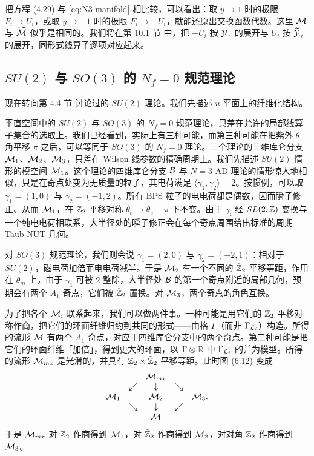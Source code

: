 把方程 (4.29)%
与 \eqref{eq:N3-manifold} 相比较，可以看出：取 $y\to 1$ 时的极限 $F_i\to U_i$，或取 $y\to -1$ 时的极限 $F_i\to -U_i$，就能还原出交换函数代数。这里 $\mathcal{M}$ 与 $\widetilde{\cal M}$ 似乎是相同的。我们将在第 10.1 节%
中，把 $-U_i$ 按 $\mathcal{Y}_\gamma$ 的展开与 $U_i$ 按 $\widetilde{\cal Y}_\gamma$ 的展开，同形式线算子逐项对应起来。

\subsection{$SU(2)$ 与 $SO(3)$ 的 $N_f=0$ 规范理论}\label{subsec:SU2-Functions}

现在转向第 4.4 节%
讨论过的 $SU(2)$ 理论。我们先描述 $u$ 平面上的纤维化结构。

平直空间中的 $SU(2)$ 与 $SO(3)$ 的 $N_f=0$ 规范理论，只差在允许的局部线算子集合的选取上。我们已经看到，实际上有三种可能，而第三种可能在把紫外 $\theta$ 角平移 $\pi$ 之后，可以等同于 $SO(3)$ 的 $N_f=0$ 理论。三个理论的三维库仑分支 $\mathcal{M}_1$、$\mathcal{M}_2$、$\mathcal{M}_3$，只差在 Wilson 线参数的精确周期上。我们先描述 $SU(2)$ 情形的模空间 $\mathcal{M}_1$。这个理论的四维库仑分支 $\mathcal{B}$ 与 $N=3$ AD 理论的情形惊人地相似，只是在奇点处变为无质量的粒子，其电荷满足 $\langle\gamma_1,\gamma_2\rangle=2$。按惯例，可以取 $\gamma_1=(1,0)$ 与 $\gamma_2=(-1,2)$。所有 BPS 粒子的电电荷都是偶数，因而瞬子修正、从而 $\mathcal{M}_1$，在 $\mathbb{Z}_2$ 平移对称 $\tilde\theta_e\to\tilde\theta_e+\pi$ 下不变。由于 $\gamma_i$ 经 $SL(2,\mathbb{Z})$ 变换与一个纯电电荷相联系，大半径处的瞬子修正会在每个奇点周围给出标准的周期 Taub-NUT 几何。

对 $SO(3)$ 规范理论，我们则会说 $\gamma_1=(2,0)$ 与 $\gamma_2=(-2,1)$：相对于 $SU(2)$，磁电荷加倍而电电荷减半。于是 $\mathcal{M}_2$ 有一个不同的 $\tilde{\mathbb{Z}}_2$ 平移等距，作用在 $\tilde\theta_m$ 上。由于 $\gamma_1$ 可被 $2$ 整除，大半径处 $\mathcal{B}$ 的第一个奇点附近的局部几何，预期会有两个 $A_1$ 奇点，它们被 $\tilde{\mathbb{Z}}_2$ 置换。对 $\mathcal{M}_3$，两个奇点的角色互换。

为了把各个 $\mathcal{M}_i$ 联系起来，我们可以做两件事。一种可能是用它们的 $\mathbb{Z}_2$ 平移对称作商，把它们的环面纤维归约到共同的形式——由格 $\Gamma$（而非 $\Gamma_{\mathcal{L}_i}$）构造。所得的流形 $\mathcal{M}$ 有两个 $A_1$ 奇点，对应于四维库仑分支中的两个奇点。第二种可能是把它们的环面纤维「加倍」，得到更大的环面，以 $\Gamma\otimes\mathbb{R}$ 中 $\Gamma_{\mathcal{L}_i}$ 的并为模型。所得的流形 $\mathcal{M}_{mx}$ 是光滑的，并具有 $\mathbb{Z}_2\times\tilde{\mathbb{Z}}_2$ 平移等距。此时图 (6.12) 变成%
\begin{equation}\label{eq:A1-covering-maps}
\begin{matrix}
    &  &  \mathcal{M}_{mx} &  &   \\
    & \swarrow & \downarrow  &  \searrow & \\
    \mathcal{M}_{1} &  & \mathcal{M}_{2} &  & \mathcal{M}_{3} \\
    & \searrow & \downarrow  &  \swarrow & \\
    &  &  \mathcal{M} &  &   \\
\end{matrix}.
\end{equation}
于是 $\mathcal{M}_{mx}$ 对 $\mathbb{Z}_2$ 作商得到 $\mathcal{M}_1$，对 $\tilde{\mathbb{Z}}_2$ 作商得到 $\mathcal{M}_2$，对对角 $\mathbb{Z}_2$ 作商得到 $\mathcal{M}_3$。

